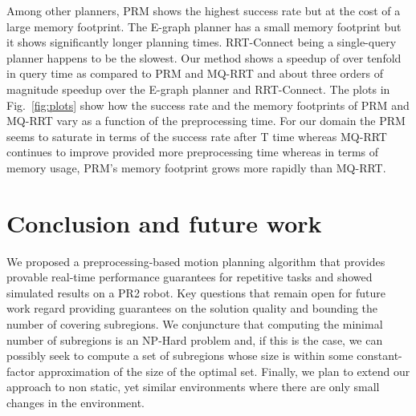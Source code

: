 \documentclass[letterpaper]{article} %
\begin{document}
Among other planners, \textsf{PRM} shows the highest success rate but at the cost of a large memory footprint. The \textsf{E-graph} planner has a small memory footprint but it shows significantly longer planning times. \textsf{RRT-Connect} being a single-query planner happens to be the slowest. Our method shows a speedup of over tenfold in query time as compared to \textsf{PRM} and \textsf{MQ-RRT} and about three orders of magnitude speedup over the \textsf{E-graph} planner and \textsf{RRT-Connect}. The plots in Fig.~\ref{fig:plots} show how the success rate and the memory footprints of \textsf{PRM} and \textsf{MQ-RRT} vary as a function of the preprocessing time. For our domain the \textsf{PRM} seems to saturate in terms of the success rate after T time whereas \textsf{MQ-RRT} continues to improve provided more preprocessing time whereas in terms of memory usage, \textsf{PRM}'s memory footprint grows more rapidly than \textsf{MQ-RRT}.

\section{Conclusion and future work}
We proposed a preprocessing-based motion planning algorithm that provides provable real-time performance guarantees for repetitive tasks and showed simulated results on a PR2 robot. 
Key questions that remain open for future work regard providing guarantees on the solution quality and bounding the number of covering subregions.
We conjuncture that computing the minimal number of subregions is an \textsf{NP-Hard} problem and, if this is the case, we can possibly seek to compute a set of subregions whose size is within some constant-factor approximation of  the size of the optimal set.
Finally, we plan to extend our approach to non static, yet similar environments where there are only small changes in the environment. 


\end{document}

